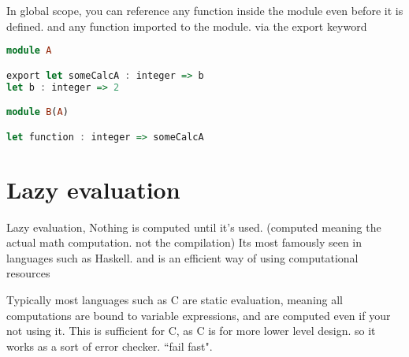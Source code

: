 \documentclass{article}
\begin{document}
In global scope, you can reference any function inside the module even before it is defined. and any function imported to the module. via the export keyword

\begin{lstlisting}[language=Haskell]
module A

export let someCalcA : integer => b
let b : integer => 2

module B(A)

let function : integer => someCalcA 
\end{lstlisting}









     


\section{Lazy evaluation}

Lazy evaluation, Nothing is computed until it's used.
(computed meaning the actual math computation. not the compilation)
Its most famously seen in languages such as Haskell. and is an efficient way of using computational resources 

Typically most languages such as C are static evaluation, meaning all computations are bound to variable expressions, and are computed even if your not using it. This is sufficient for C, as C is for more lower level design. so it works as a sort of error checker. ``fail fast". 
\end{document}
